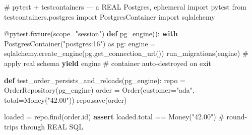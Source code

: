 \documentclass[11pt]{article}
\newenvironment{Shaded}{\begin{snugshade}}{\end{snugshade}}
\newcommand{\AttributeTok}[1]{\textcolor[rgb]{0.16,0.50,0.73}{#1}}
\newcommand{\BuiltInTok}[1]{\textcolor[rgb]{0.50,0.55,0.55}{#1}}
\newcommand{\CommentTok}[1]{\textcolor[rgb]{0.48,0.49,0.49}{#1}}
\newcommand{\ControlFlowTok}[1]{\textcolor[rgb]{0.99,0.74,0.29}{\textbf{#1}}}
\newcommand{\ImportTok}[1]{\textcolor[rgb]{0.15,0.68,0.38}{#1}}
\newcommand{\KeywordTok}[1]{\textcolor[rgb]{0.81,0.81,0.76}{\textbf{#1}}}
\newcommand{\NormalTok}[1]{\textcolor[rgb]{0.81,0.81,0.76}{#1}}
\newcommand{\OperatorTok}[1]{\textcolor[rgb]{0.81,0.81,0.76}{#1}}
\newcommand{\StringTok}[1]{\textcolor[rgb]{0.96,0.31,0.31}{#1}}
\begin{document}
\begin{Shaded}
\begin{Highlighting}[]
\CommentTok{\# pytest + testcontainers — a REAL Postgres, ephemeral}
\ImportTok{import}\NormalTok{ pytest}
\ImportTok{from}\NormalTok{ testcontainers.postgres }\ImportTok{import}\NormalTok{ PostgresContainer}
\ImportTok{import}\NormalTok{ sqlalchemy}

\AttributeTok{@pytest.fixture}\NormalTok{(scope}\OperatorTok{=}\StringTok{"session"}\NormalTok{)}
\KeywordTok{def}\NormalTok{ pg\_engine():}
    \ControlFlowTok{with}\NormalTok{ PostgresContainer(}\StringTok{"postgres:16"}\NormalTok{) }\ImportTok{as}\NormalTok{ pg:}
\NormalTok{        engine }\OperatorTok{=}\NormalTok{ sqlalchemy.create\_engine(pg.get\_connection\_url())}
\NormalTok{        run\_migrations(engine)        }\CommentTok{\# apply real schema}
        \ControlFlowTok{yield}\NormalTok{ engine}
        \CommentTok{\# container auto{-}destroyed on exit}

\KeywordTok{def}\NormalTok{ test\_order\_persists\_and\_reloads(pg\_engine):}
\NormalTok{    repo }\OperatorTok{=}\NormalTok{ OrderRepository(pg\_engine)}
\NormalTok{    order }\OperatorTok{=}\NormalTok{ Order(customer}\OperatorTok{=}\StringTok{"ada"}\NormalTok{, total}\OperatorTok{=}\NormalTok{Money(}\StringTok{"42.00"}\NormalTok{))}
\NormalTok{    repo.save(order)}

\NormalTok{    loaded }\OperatorTok{=}\NormalTok{ repo.find(order.}\BuiltInTok{id}\NormalTok{)}
    \ControlFlowTok{assert}\NormalTok{ loaded.total }\OperatorTok{==}\NormalTok{ Money(}\StringTok{"42.00"}\NormalTok{)   }\CommentTok{\# round{-}trips through REAL SQL}
\end{Highlighting}
\end{Shaded}

\end{document}
